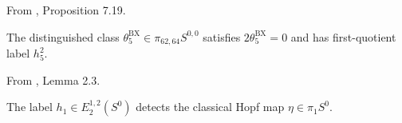 


\begin{theorem}
\label{frontier:Literature:cb4dd3fedc28}
From \cite{BurklundXu}, Proposition 7.19.\par

The distinguished class $\theta_5^{\mathrm{BX}}\in\pi_{62,64}S^{0,0}$ satisfies $2\theta_5^{\mathrm{BX}}=0$ and has first-quotient label $h_5^2$.
\end{theorem}

\begin{theorem}
\label{frontier:Literature:da6f8834fbe5}
From \cite{Adams58}, Lemma 2.3.\par

The label $h_1\in E_2^{1,2}(S^0)$ detects the classical Hopf map $\eta\in\pi_1S^0$.
\end{theorem}

